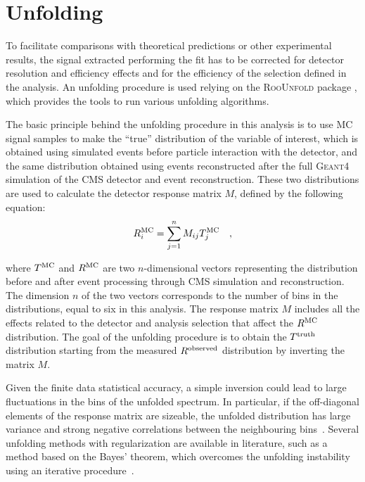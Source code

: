 \section{Unfolding}
\label{sec:Unfolding}

To facilitate comparisons with theoretical predictions or other experimental results, the signal
extracted performing the fit has to be corrected for detector resolution and
efficiency effects and for the efficiency of the selection defined in the
analysis.
An unfolding procedure is used relying on the \textsc{RooUnfold} package
\cite{Adye:2011gm}, which provides the tools to run various unfolding
algorithms.

The basic principle behind the unfolding procedure in this analysis is to use MC signal samples
to make the ``true'' distribution of the variable of interest, which is obtained using simulated events before particle interaction with the detector, and the same distribution obtained using events reconstructed after the full \textsc{Geant4} simulation of the CMS detector
and event reconstruction. 
These two distributions are used to calculate the detector response matrix $M$, defined by the following equation:
\begin{equation}\label{eq:resp_matrix}
R_{i}^{\rm {MC}} = \sum_{j=1}^{n} M_{ij}T_{j}^{\rm {MC}} \quad ,
\end{equation}

\noindent where $T^{\rm{MC}}$ and $R^{\rm{MC}}$ are two $n$-dimensional vectors
representing the distribution before and after event processing through CMS
simulation and reconstruction. The dimension $n$ of the two vectors corresponds 
to the number of bins in the distributions, equal to six in this analysis.
The response matrix $M$ includes all the effects related to the detector and analysis selection that affect the $R^{\rm{MC}}$ distribution.
The goal of the unfolding procedure is to obtain the $T^{\rm{truth}}$ distribution starting from the measured
$R^{\rm{observed}}$ distribution by inverting the matrix $M$.

Given the finite data statistical accuracy, a simple inversion could lead to large fluctuations in the bins of the unfolded spectrum. In particular, if the off-diagonal elements of the response matrix are sizeable, the unfolded distribution has large variance and strong negative correlations between the neighbouring bins~\cite{Cowan:2002in}. Several unfolding methods with regularization are available in literature, such as a method based on the Bayes' theorem, which overcomes the unfolding instability using an iterative procedure~\cite{DAgostini:1994zf}.

